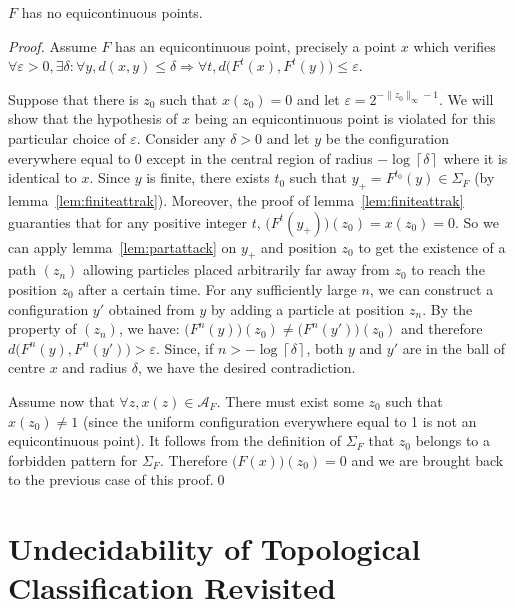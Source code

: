 \documentclass{llncs}
\renewcommand{\epsilon}{\varepsilon}
\newcommand{\A}{\mathcal{A}}
\newcommand{\acf}{F}
\newcommand{\obst}{\Sigma_{\acf}}
\newcommand{\obstset}{\A_F}
\begin{document}
\begin{proposition}
  \label{prop:noequ}
  $\acf$ has no equicontinuous points.
\end{proposition}
\begin{proof}
  Assume $\acf$ has an equicontinuous point, precisely a point $x$ which
  verifies ${\forall\epsilon>0,\exists\delta : \forall y,
    d(x,y)\leq\delta\Rightarrow \forall t,
    d\bigl(\acf^t(x),\acf^t(y)\bigr)\leq\epsilon}$.

  Suppose that there is $z_0$ such that ${x(z_0)=0}$ and let
  ${\epsilon = 2^{-\|z_0\|_\infty-1}}$. We will show that the
  hypothesis of $x$ being an equicontinuous point is violated for this
  particular choice of $\epsilon$. Consider any ${\delta>0}$ and let
  $y$ be the configuration everywhere equal to $0$ except in the
  central region of radius ${-\log \left\lceil\delta\right\rceil}$
  where it is identical to $x$. Since $y$ is finite, there exists
  $t_0$ such that ${y_+=\acf^{t_0}(y)\in\obst}$ (by
  lemma~\ref{lem:finiteattrak}).  Moreover, the proof of
  lemma~\ref{lem:finiteattrak} guaranties that for any positive
  integer $t$, ${\bigl(\acf^t(y_+)\bigr)(z_0)=x(z_0)=0}$. So we can apply
  lemma~\ref{lem:partattack} on $y_+$ and position $z_0$ to get the
  existence of a path ${(z_n)}$ allowing particles placed arbitrarily
  far away from $z_0$ to reach the position $z_0$ after a certain
  time. For any sufficiently large $n$, we can construct a
  configuration $y'$ obtained from $y$ by adding a particle at
  position $z_n$. By the property of ${(z_n)}$, we have:
  ${\bigl(\acf^n(y)\bigr)(z_0)\not=\bigl(\acf^n(y')\bigr)(z_0)}$ and
  therefore ${d\bigl(\acf^n(y),\acf^n(y')\bigr)>\epsilon}$. Since, if
  ${n>-\log \left\lceil\delta\right\rceil}$, both $y$ and $y'$ are in
  the ball of centre $x$ and radius $\delta$, we have the desired
  contradiction.

  Assume now that ${\forall z, x(z)\in\obstset}$. There must exist
  some $z_0$ such that ${x(z_0)\not=1}$ (since the uniform
  configuration everywhere equal to 1 is not an equicontinuous point).
  It follows from the definition of $\obst$ that $z_0$ belongs to a
  forbidden pattern for $\obst$. Therefore
  ${\bigl(\acf(x)\bigr)(z_0)=0}$ and we are brought back to the
  previous case of this proof.\qed
\end{proof}

\section{Undecidability of Topological Classification Revisited}
\label{sec:classif}
\end{document}
